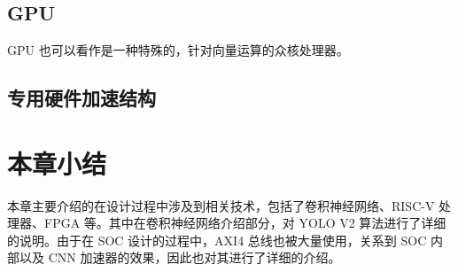\subsection{GPU}

GPU 也可以看作是一种特殊的，针对向量运算的众核处理器。

\subsection{专用硬件加速结构}

\section{本章小结}

本章主要介绍的在设计过程中涉及到相关技术，包括了卷积神经网络、RISC-V 处理器、FPGA 等。其中在卷积神经网络介绍部分，对 YOLO V2 算法进行了详细的说明。由于在 SOC 设计的过程中，AXI4 总线也被大量使用，关系到 SOC 内部以及 CNN 加速器的效果，因此也对其进行了详细的介绍。
